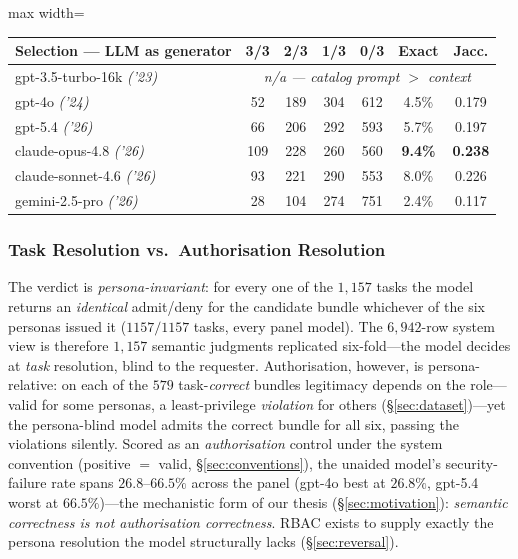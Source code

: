 \documentclass[sigconf,review,anonymous]{acmart}
\begin{document}
\begin{table}[!t]
\vspace{4pt}
\begin{adjustbox}{max width=\columnwidth}
\begin{tabular}{@{}lcccccc@{}}
\toprule
\textbf{Selection --- LLM as generator} & \textbf{3/3} & \textbf{2/3} & \textbf{1/3} & \textbf{0/3} & \textbf{Exact} & \textbf{Jacc.} \\
\midrule
gpt-3.5-turbo-16k \textit{('23)} & \multicolumn{6}{c}{\textit{n/a --- catalog prompt $>$ context}} \\
gpt-4o \textit{('24)}            &  52 & 189 & 304 & 612 & 4.5\% & 0.179 \\
gpt-5.4 \textit{('26)}           &  66 & 206 & 292 & 593 & 5.7\% & 0.197 \\
claude-opus-4.8 \textit{('26)}   & 109 & 228 & 260 & 560 & \textbf{9.4\%} & \textbf{0.238} \\
claude-sonnet-4.6 \textit{('26)} &  93 & 221 & 290 & 553 & 8.0\% & 0.226 \\
gemini-2.5-pro \textit{('26)}    &  28 & 104 & 274 & 751 & 2.4\% & 0.117 \\
\bottomrule
\end{tabular}
\end{adjustbox}
\end{table}

\subsubsection{Task Resolution vs.\ Authorisation Resolution}
\label{sec:resolution_gap}

The verdict is \emph{persona-invariant}: for every one of the $1{,}157$ tasks the model returns an \emph{identical} admit/deny for the candidate bundle whichever of the six personas issued it ($1157/1157$ tasks, every panel model). The $6{,}942$-row system view is therefore $1{,}157$ semantic judgments replicated six-fold---the model decides at \emph{task} resolution, blind to the requester. Authorisation, however, is persona-relative: on each of the $579$ task-\emph{correct} bundles legitimacy depends on the role---valid for some personas, a least-privilege \emph{violation} for others (\S\ref{sec:dataset})---yet the persona-blind model admits the correct bundle for all six, passing the violations silently. Scored as an \emph{authorisation} control under the system convention (positive $=$ valid, \S\ref{sec:conventions}), the unaided model's security-failure rate spans $26.8$--$66.5\%$ across the panel (gpt-4o best at $26.8\%$, gpt-5.4 worst at $66.5\%$)---the mechanistic form of our thesis (\S\ref{sec:motivation}): \emph{semantic correctness is not authorisation correctness}. RBAC exists to supply exactly the persona resolution the model structurally lacks (\S\ref{sec:reversal}).
\end{document}
